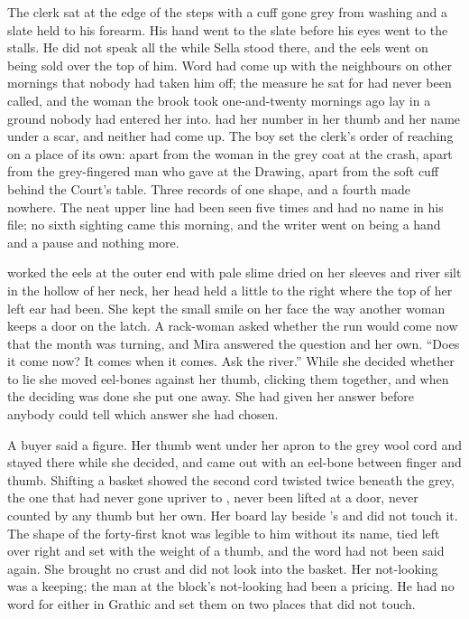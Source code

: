 The clerk sat at the edge of the steps with a cuff gone grey from washing and a slate held to his forearm. His hand went to the slate before his eyes went to the stalls. He did not speak all the while Sella stood there, and the eels went on being sold over the top of him. Word had come up with the neighbours on other mornings that nobody had taken him off; the measure he sat for had never been called, and the woman the brook took one-and-twenty mornings ago lay in a ground nobody had entered her into.  had her number in her thumb and her name under a scar, and neither had come up. The boy set the clerk's order of reaching on a place of its own: apart from the woman in the grey coat at the crash, apart from the grey-fingered man who gave at the Drawing, apart from the soft cuff behind the Court's table. Three records of one shape, and a fourth made nowhere. The neat upper line had been seen five times and had no name in his file; no sixth sighting came this morning, and the writer went on being a hand and a pause and nothing more.

 worked the eels at the outer end with pale slime dried on her sleeves and river silt in the hollow of her neck, her head held a little to the right where the top of her left ear had been. She kept the small smile on her face the way another woman keeps a door on the latch. A rack-woman asked whether the run would come now that the month was turning, and Mira answered the question and her own. “Does it come now? It comes when it comes. Ask the river.” While she decided whether to lie she moved eel-bones against her thumb, clicking them together, and when the deciding was done she put one away. She had given her answer before anybody could tell which answer she had chosen.

A buyer said a figure. Her thumb went under her apron to the grey wool cord and stayed there while she decided, and came out with an eel-bone between finger and thumb. Shifting a basket showed the second cord twisted twice beneath the grey, the one that had never gone upriver to , never been lifted at a door, never counted by any thumb but her own. Her board lay beside 's  and did not touch it. The shape of the forty-first knot was legible to him without its name, tied left over right and set with the weight of a thumb, and the word had not been said again. She brought no crust and did not look into the basket. Her not-looking was a keeping; the man at the block's not-looking had been a pricing. He had no word for either in Grathic and set them on two places that did not touch.

